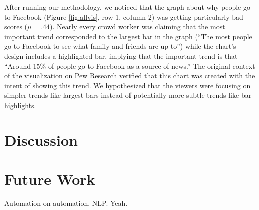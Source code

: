 \documentclass{sigchi}
\begin{document}
After running our methodology, we noticed that the graph about why
people go to Facebook (Figure \ref{fig:allvis}, row 1, column 2) was
getting particularly bad scores ($\mu=.44$). Nearly every crowd worker
was claiming that the most important trend corresponded to the largest
bar in the graph (``The most people go to Facebook to see what family
and friends are up to'') while the chart's design includes a
highlighted bar, implying that the important trend is that ``Around
15\% of people go to Facebook as a source of news.'' The original
context of the visualization on Pew Research verified that this chart
was created with the intent of showing this trend. We hypothesized
that the viewers were focusing on simpler trends like largest bars
instead of potentially more subtle trends like bar highlights.

\section{Discussion}

\section{Future Work}

Automation on automation. NLP. Yeah.



\end{document}
